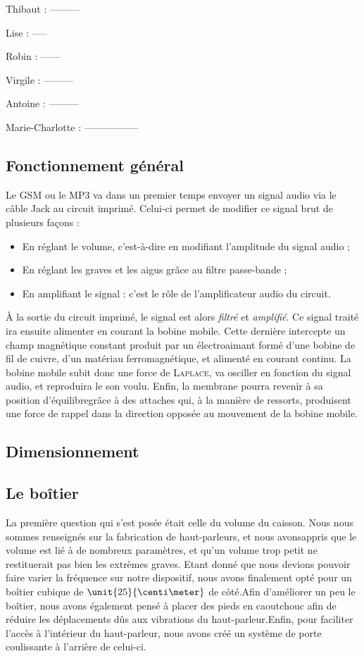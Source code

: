 
Thibaut :
---------


Lise :
-----


Robin :
------


Virgile :
---------


Antoine :
---------


Marie-Charlotte :
-----------------

\subsection{Fonctionnement général}

Le GSM ou le MP3 va dans un premier temps envoyer un signal audio via le câble Jack au circuit imprimé. Celui-ci permet
 de modifier ce signal brut de plusieurs façons :

\begin{itemize}
\item En réglant le volume, c'est-à-dire en modifiant l'amplitude du signal audio ;
\item En réglant les graves et les aigus grâce au filtre passe-bande ;
\item En amplifiant le signal : c'est le rôle de l'amplificateur audio du circuit.
\end{itemize}

À la sortie du circuit imprimé, le signal est alors \textit{filtré} et \textit{amplifié}.
Ce signal traité ira ensuite alimenter en courant la bobine mobile. Cette dernière intercepte un champ magnétique constant 
produit par un électroaimant formé d'une bobine de fil de cuivre, d'un matériau ferromagnétique, et alimenté en courant continu.
La bobine mobile subit donc une force de \textsc{Laplace}, va osciller en fonction du  signal audio, et reproduira le son voulu.
Enfin, la membrane pourra revenir à sa position d'équilibregrâce à des attaches qui, à la manière de ressorts, produisent une
force de rappel dans la direction opposée au mouvement de la bobine mobile. 

\subsection{Dimensionnement}


\subsection{Le boîtier}
La première question qui s'est posée était celle du volume du caisson. Nous nous sommes renseignés sur la fabrication de 
haut-parleurs, et nous avonsappris que le volume est lié à de nombreux paramètres, et qu'un volume trop petit ne restituerait 
pas bien les extrèmes graves. Etant donné que nous devions pouvoir faire varier la fréquence sur notre dispositif, nous avons 
finalement opté pour un boîtier cubique de $\unit{25}{\centi\meter}$ de côté.Afin d'améliorer un peu le boîtier, nous avons
également pensé à placer des pieds en caoutchouc afin de réduire les déplacements dûs aux vibrations du haut-parleur.Enfin,
pour faciliter l'accès à l'intérieur du haut-parleur, nous avons créé un système de porte coulissante à l'arrière de celui-ci.

